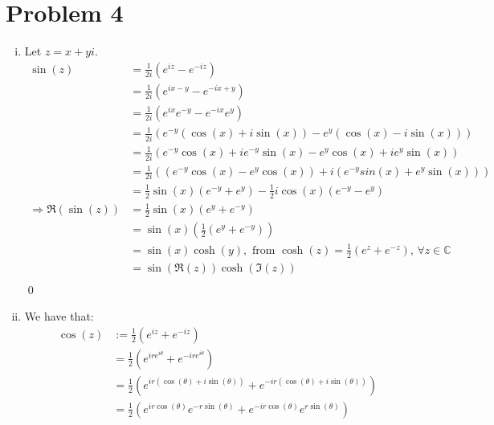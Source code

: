 \documentclass[a4paper, titlepage, DIV=14]{scrartcl}
\begin{document}
    \section*{Problem 4}
    \begin{enumerate}[(i)]
        \item Let $z = x + yi$. 
        \begin{align*}
            \sin(z) &= \frac{1}{2i}(e^{iz}-e^{-iz}) \\
                &= \frac{1}{2i}(e^{ix-y} - e^{-ix + y}) \\
                &= \frac{1}{2i}(e^{ix}e^{-y} - e^{-ix}e^{y}) \\
                &= \frac{1}{2i}(e^{-y}(\cos(x) + i\sin(x)) - e^{y}(\cos(x) - i\sin(x))) \\
                &= \frac{1}{2i}(e^{-y}\cos(x) + ie^{-y}\sin(x) - e^{y}\cos(x) + ie^{y}\sin(x)) \\
                &= \frac{1}{2i}((e^{-y}\cos(x) - e^{y}\cos(x)) + i(e^{-y}sin(x)+e^{y}\sin(x))) \\
                &= \frac{1}{2}\sin(x)(e^{-y}+e^{y}) -\frac{1}{2}i\cos(x)(e^{-y} - e^{y}) \\
            \Rightarrow \Re(\sin(z)) &= \frac{1}{2}\sin(x)(e^{y}+e^{-y}) \\
                &= \sin(x)(\frac{1}{2}(e^{y}+e^{-y})) \\
                &= \sin(x)\cosh(y), \text{ from } \cosh(z) = \frac{1}{2}(e^{z}+e^{-z}), \, \forall z \in \mathbb{C} \\
                &= \sin(\Re(z))\cosh(\Im(z)) \\
        \end{align*} \qed
        
        \item We have that:
        \begin{align*}
            \cos(z) &:= \frac{1}{2}(e^{iz}+e^{-iz}) \\
                    &= \frac{1}{2}(e^{ire^{i\theta}} + e^{-ire^{i\theta}}) \\
                    &= \frac{1}{2}(e^{ir(\cos(\theta)+i\sin(\theta))} + e^{-ir(\cos(\theta)+i\sin(\theta))}) \\
                    &= \frac{1}{2}(e^{ir\cos(\theta)}e^{-r\sin(\theta)} + e^{-ir\cos(\theta)}e^{r\sin(\theta)}) \\
        \end{align*}
        
        
    \end{enumerate}
\end{document}
